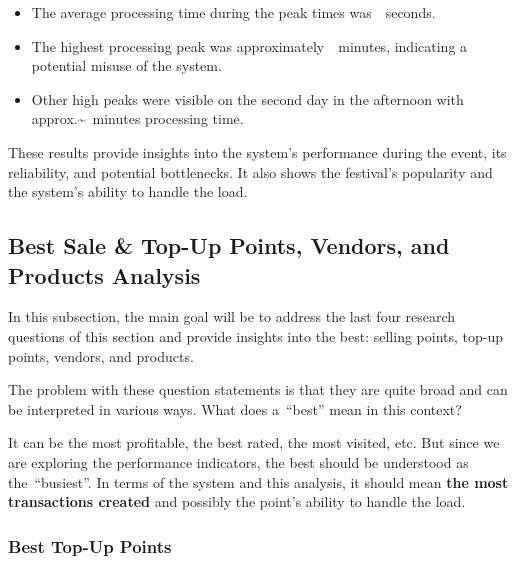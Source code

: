 \begin{keytakeaways}
	\begin{itemize}
		\item The average processing time during the peak times was~~seconds.
		\item The highest processing peak was approximately~~minutes, indicating a potential misuse of the system.
		\item Other high peaks were visible on the second day in the afternoon with approx.\~~minutes processing time.
	\end{itemize}
\end{keytakeaways}

These results provide insights into the system's performance during the event, its reliability, and potential bottlenecks.
It also shows the festival's popularity and the system's ability to handle the load.


\subsection{Best Sale \& Top-Up Points, Vendors, and Products Analysis}
\label{subsec:analysis-performance-indicators-best}
In this subsection, the main goal will be to address the last four research questions of this section and provide insights into the best: selling points, top-up points, vendors, and products.

The problem with these question statements is that they are quite broad and can be interpreted in various ways.
What does a~\enquote{best} mean in this context?

It can be the most profitable, the best rated, the most visited, etc.
But since we are exploring the performance indicators, the best should be understood as the~\enquote{busiest}.
In terms of the system and this analysis, it should mean \textbf{the most transactions created} and possibly the point's ability to handle the load.


\subsubsection{Best Top-Up Points}
\label{subsubsec:analysis-best-top-up-points}

